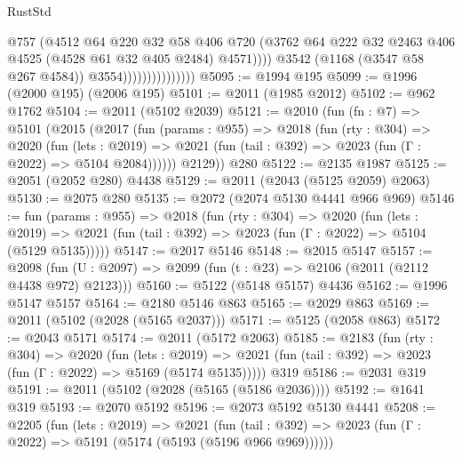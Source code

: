 \begin{lexlean}{RustStd}
\begin{coremodule}
                                      @757
                                      (@4512
                                        @64
                                        @220
                                        @32
                                        @58
                                        @406
                                        @720
                                        (@3762
                                          @64
                                          @222
                                          @32
                                          @2463
                                          @406
                                          @4525
                                          (@4528 @61 @32 @405 @2484)
                                          @4571))))
                                  @3542
                                  (@1168 (@3547 @58 @267 @4584))
                                  @3554)))))))))))))))
@5095 := @1994 @195
@5099 := @1996 (@2000 @195) (@2006 @195)
@5101 := @2011 (@1985 @2012)
@5102 := @962 @1762
@5104 := @2011 (@5102 @2039)
@5121 := @2010
    (fun (fn : @7) =>
    @5101
      (@2015
        (@2017
          (fun (params : @955) =>
          @2018
            (fun (rty : @304) =>
            @2020
              (fun (lets : @2019) =>
              @2021 (fun (tail : @392) => @2023 (fun (Γ : @2022) => @5104 @2084))))))
        @2129))
    @280
@5122 := @2135 @1987
@5125 := @2051 (@2052 @280) @4438
@5129 := @2011 (@2043 (@5125 @2059) @2063)
@5130 := @2075 @280
@5135 := @2072 (@2074 @5130 @4441 @966 @969)
@5146 := fun (params : @955) =>
  @2018
    (fun (rty : @304) =>
    @2020
      (fun (lets : @2019) =>
      @2021 (fun (tail : @392) => @2023 (fun (Γ : @2022) => @5104 (@5129 @5135)))))
@5147 := @2017 @5146
@5148 := @2015 @5147
@5157 := @2098 (fun (U : @2097) => @2099 (fun (t : @23) => @2106 (@2011 (@2112 @4438 @972) @2123)))
@5160 := @5122 (@5148 @5157) @4436
@5162 := @1996 @5147 @5157
@5164 := @2180 @5146 @863
@5165 := @2029 @863
@5169 := @2011 (@5102 (@2028 (@5165 @2037)))
@5171 := @5125 (@2058 @863)
@5172 := @2043 @5171
@5174 := @2011 (@5172 @2063)
@5185 := @2183
    (fun (rty : @304) =>
    @2020
      (fun (lets : @2019) =>
      @2021 (fun (tail : @392) => @2023 (fun (Γ : @2022) => @5169 (@5174 @5135)))))
    @319
@5186 := @2031 @319
@5191 := @2011 (@5102 (@2028 (@5165 (@5186 @2036))))
@5192 := @1641 @319
@5193 := @2070 @5192
@5196 := @2073 @5192 @5130 @4441
@5208 := @2205
    (fun (lets : @2019) =>
    @2021 (fun (tail : @392) => @2023 (fun (Γ : @2022) => @5191 (@5174 (@5193 (@5196 @966 @969))))))

\end{coremodule}
\end{lexlean}
